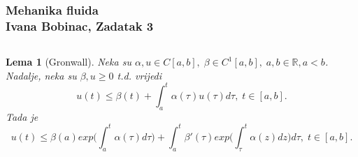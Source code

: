 \documentclass[a4paper,oneside,12pt]{memoir} %
\newtheorem*{lema}{Lema}
\begin{document}
\subsubsection*{Mehanika fluida \\ Ivana Bobinac, Zadatak 3}	
$ $
\begin{lema}[Gronwall]
Neka su $\alpha, u \in C[a, b], \; \beta \in C^1[a, b], \; a, b \in \mathbb{R}, a < b$. Nadalje, neka su $\beta, u \geq 0$ t.d. vrijedi
\begin{equation} \label{eq:1}
u(t) \leq \beta(t) + \int_a^t \alpha(\tau) u(\tau) d\tau, \; t \in [a, b].
\end{equation}
Tada je
\begin{equation} \label{eq:2}
u(t) \leq \beta(a) exp\Big( \int_a^t \alpha(\tau) d\tau \Big) + \int_a^t \beta'(\tau) exp\Big( \int_{\tau}^t \alpha(z) dz \Big) d\tau, \; t \in [a, b].
\end{equation}
\end{lema}
\end{document}

